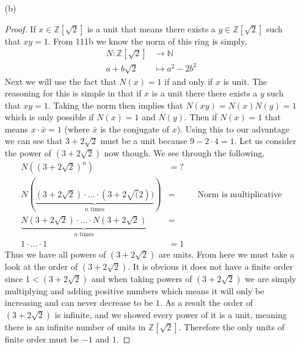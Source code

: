 \documentclass[11pt]{article}
\newcommand{\zz}{\mathbb Z}   %
\newcommand{\nn}{\mathbb N}   %
\begin{document}
\begin{itemize}
\begin{proof}
    \end{proof}
    \item[(b)]
    \begin{proof}
        If $x\in \zz[\sqrt{2}]$ is a unit that means there exists a $y \in \zz[\sqrt{2}]$ such that $xy = 1$. From 111b we know the norm of this ring is simply,
        \begin{align*}
            N: \zz[\sqrt{2}] &\rightarrow \nn \\
            a +b\sqrt{2} &\mapsto a^{2} - 2b^{2}
        \end{align*}
        Next we will use the fact that $N(x) =1$ if and only if $x$ is unit. The reasoning for this is simple in that if $x$ is a unit there there exists a $y$ such that $xy = 1$. Taking the norm then implies that $N(xy) = N(x)N(y) =1$ which is only possible if $N(x) =1$ and $N(y)$. Then if $N(x) =1 $ that means $x \cdot \bar{x} = 1$ (where $\bar{x}$ is the conjugate of $x$). Using this to our advantage we can see that $3 + 2\sqrt{2}$ must be a unit because $9 -2\cdot4 = 1$. Let us consider the power of $(3 + 2\sqrt2)$ now though. We see through the following,
        \begin{align*}
            N((3 + 2\sqrt{2})^{n}) &= ? \\
            N(\underbrace{(3 + 2\sqrt{2})\cdot \dots \cdot(3 + 2\sqrt(2))}_{n \text{ times}}) &=  &&\text{Norm is multiplicative}\\
            \underbrace{N(3 + 2 \sqrt{2})\cdot \dots \cdot N(3 +2\sqrt{2})}_{n \text{ times}} &= && \\
            1 \cdot \dots \cdot 1 &= 1
        \end{align*}
        Thus we have all powers of $(3+2\sqrt{2})$ are units. From here we must take a look at the order of $(3+ 2\sqrt{2})$. It is obvious it does not have a finite order since $1 < (3 + 2 \sqrt{2})$ and when taking powers of $(3 + 2 \sqrt{2})$ we are simply multiplying and adding positive numbers which means it will only be increasing and can never decrease to be $1$. As a result the order of $(3 + 2\sqrt{2})$ is infinite, and we showed every power of it is a unit, meaning there is an infinite number of units in $\zz[\sqrt{2}]$. Therefore the only units of finite order must be $-1$ and $1$. 
    \end{proof} 


\end{itemize}
\end{document}
